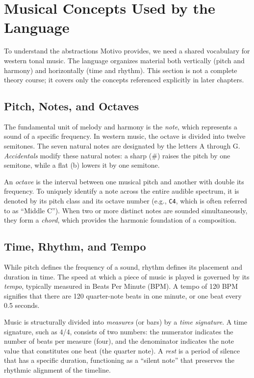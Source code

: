 \section{Musical Concepts Used by the Language}\label{sec:music-theory-primer}

To understand the abstractions Motivo provides, we need a shared vocabulary for western tonal music.
The language organizes material both vertically (pitch and harmony) and horizontally (time and rhythm).
This section is not a complete theory course; it covers only the concepts referenced explicitly in later
chapters.

\subsection{Pitch, Notes, and Octaves}\label{detail-subsec:pitch-notes-and-octaves}

The fundamental unit of melody and harmony is the \textit{note}, which represents a sound of a specific frequency.
In western music, the octave is divided into twelve semitones.
The seven natural notes are designated by the letters A through G\@.
\textit{Accidentals} modify these natural notes: a sharp (\#) raises the pitch by one semitone, while a flat (b) lowers
it by one semitone.

An \textit{octave} is the interval between one musical pitch and another with double its frequency.
To uniquely identify a note across the entire audible spectrum, it is denoted by its pitch class and its octave number
(e.g., \texttt{C4}, which is often referred to as ``Middle C'').
When two or more distinct notes are sounded simultaneously, they form a \textit{chord}, which provides the harmonic
foundation of a composition.

\subsection{Time, Rhythm, and Tempo}\label{detail-subsec:time-rhythm-and-tempo}

While pitch defines the frequency of a sound, rhythm defines its placement and duration in time.
The speed at which a piece of music is played is governed by its \textit{tempo}, typically measured in Beats Per Minute
(BPM).
A tempo of 120 BPM signifies that there are 120 quarter-note beats in one minute, or one beat every 0.5 seconds.

Music is structurally divided into \textit{measures} (or bars) by a \textit{time signature}.
A time signature, such as 4/4, consists of two numbers: the numerator indicates the number of beats per measure (four),
and the denominator indicates the note value that constitutes one beat (the quarter note).
A \textit{rest} is a period of silence that has a specific duration, functioning as a ``silent note'' that preserves the
rhythmic alignment of the timeline.


